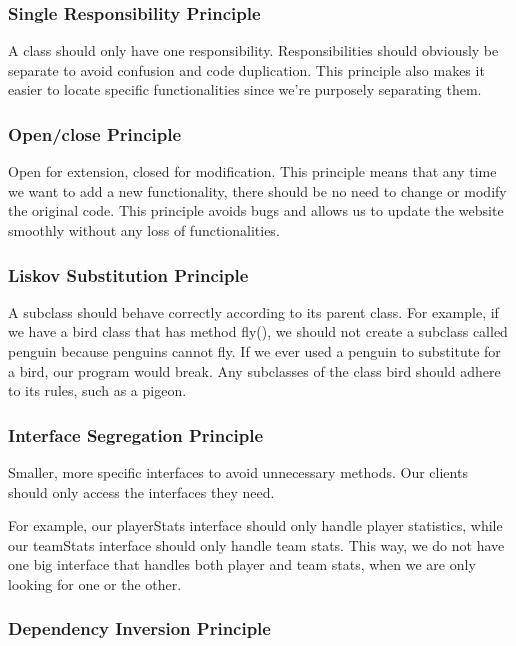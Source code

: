 \documentclass{article}
\begin{document}
\subsubsection*{Single Responsibility Principle}

A class should only have one responsibility. Responsibilities should obviously be separate to avoid confusion and code duplication. This principle also makes it easier to locate specific functionalities since we're purposely separating them.

\subsubsection*{Open/close Principle}

Open for extension, closed for modification. This principle means that any time we want to add a new functionality, there should be no need to change or modify the original code. This principle avoids bugs and allows us to update the website smoothly without any loss of functionalities.

\subsubsection*{Liskov Substitution Principle}

A subclass should behave correctly according to its parent class. For example, if we have a bird class that has method fly(), we should not create a subclass called penguin because penguins cannot fly. If we ever used a penguin to substitute for a bird, our program would break. Any subclasses of the class bird should adhere to its rules, such as a pigeon.

\subsubsection*{Interface Segregation Principle}

Smaller, more specific interfaces to avoid unnecessary methods. Our clients should only access the interfaces they need.

For example, our playerStats interface should only handle player statistics, while our teamStats interface should only handle team stats. This way, we do not have one big interface that handles both player and team stats, when we are only looking for one or the other.


\subsubsection*{Dependency Inversion Principle}
\end{document}
